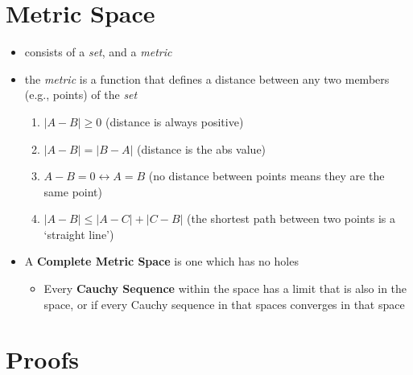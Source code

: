 \documentclass{article}
\begin{document}
\section{Metric Space}
\begin{itemize}
  \item consists of a \textit{set}, and a \textit{metric}
  \item the \textit{metric} is a function that defines a distance between
  any two members (e.g., points) of the \textit{set}
  \begin{enumerate}
    \item $|A-B|\geq 0$ (distance is always positive)
    \item $|A-B|=|B-A|$ (distance is the abs value)
    \item $A-B=0\leftrightarrow A=B$ (no distance between points means they are the same point)
    \item $|A-B|\leq |A-C|+|C-B|$ (the shortest path between two points is a \textquoteleft straight line\textquoteright)
  \end{enumerate}
  \item A \textbf{Complete Metric Space} is one which has no holes
  \begin{itemize} 
    \item Every \textbf{Cauchy Sequence} within the space has a limit that is also in the space,
    or if every Cauchy sequence in that spaces converges in that space
  \end{itemize} 
\end{itemize}
\section{Proofs}
\end{document}
